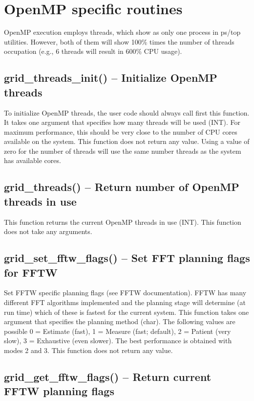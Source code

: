 \documentclass[12pt,letterpaper]{report}
\begin{document}
\section{OpenMP specific routines}

OpenMP execution employs threads, which show as only one process in ps/top utilities. However, both of them will show 100\% times the number of threads occupation (e.g., 6 threads will result in 600\% CPU usage).

\subsection{grid\_threads\_init() -- Initialize OpenMP threads}

To initialize OpenMP threads, the user code should always call first this function. It takes one argument that specifies how many threads will be used (INT). For maximum performance, this should be very close to the number of CPU cores available on the system. This function does not return any value. Using a value of zero for the number of threads will use the same number threads as the system has available cores.

\subsection{grid\_threads() -- Return number of OpenMP threads in use}

This function returns the current OpenMP threads in use (INT). This function does not take any arguments.

\subsection{grid\_set\_fftw\_flags() -- Set FFT planning flags for FFTW}

Set FFTW specific planning flags (see FFTW documentation). FFTW has many different FFT algorithms implemented and the planning stage will determine (at run time) which of these is fastest for the current system. This function takes one argument that specifies the planning method (char). The following values are possible 0 = Estimate (fast), 1 = Measure (fast; default), 2 = Patient (very slow), 3 = Exhaustive (even slower). The best performance is obtained with modes 2 and 3. This function does not return any value.

\subsection{grid\_get\_fftw\_flags() -- Return current FFTW planning flags}
\end{document}
